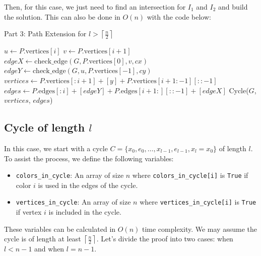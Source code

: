 Then, for this case, we just need to find an intersection
for $I_1$ and $I_2$ and build the solution. This can also
be done in $O(n)$ with the code below:

\begin{algorithm}[H]
    \caption{Part 3: Path Extension for \( l > \left \lceil \frac{n}{2} \right \rceil \)}
    \begin{algorithmic}[1]
                \State $u \gets P.\text{vertices}[i]$
                \State $v \gets P.\text{vertices}[i + 1]$
                \State $edgeX \gets \text{check\_edge}(G, P.\text{vertices}[0], v, cx)$
                \State $edgeY \gets \text{check\_edge}(G, u, P.\text{vertices}[-1], cy)$
                    \State $vertices \gets P.\text{vertices}[:i + 1] + [y] + P.\text{vertices}[i + 1:-1][::-1]$
                    \State $edges \gets P.\text{edges}[:i] + [edgeY] + P.\text{edges}[i + 1:][::-1] + [edgeX]$
                    \State \Return Cycle($G$, $vertices$, $edges$)
                \EndIf
            \EndFor
            \State \Return {} 
        \EndFunction
    \end{algorithmic}
\end{algorithm}


\subsection{Cycle of length \( l \)}

In this case, we start with a cycle \( C = \{x_0, e_0, \dots, x_{l-1}, e_{l-1}, x_{l} = x_0\} \) of length \( l \).
To assist the process, we define the following variables:

\begin{itemize}
    \item \texttt{colors\_in\_cycle}: An array of size \( n \) where \texttt{colors\_in\_cycle[i]} is \texttt{True} if color \( i \) is used in the edges of the cycle.
    \item \texttt{vertices\_in\_cycle}: An array of size \( n \) where \texttt{vertices\_in\_cycle[i]} is \texttt{True} if vertex \( i \) is included in the cycle.
\end{itemize}

These variables can be calculated in \( O(n) \) time complexity. We may assume the cycle is of length at least \( \left \lceil \frac{n}{2} \right \rceil \).
Let's divide the proof into two cases: when \( l < n - 1 \) and when \( l = n - 1 \).

